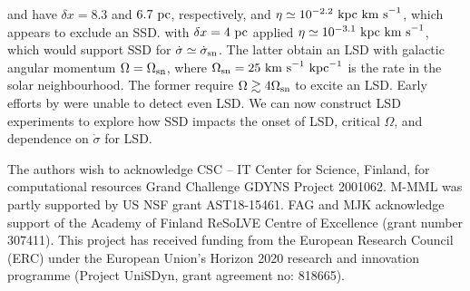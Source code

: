 \documentclass[preprint2]{aastex63}
\newcommand\SNr{\dot\sigma_{\rm sn}}
\newcommand\OSN{\Omega_{\rm sn}}
\newcommand\kpc{~ {\rm kpc}}
\newcommand\pc{~ {\rm pc}}
\newcommand\dx{ {\delta x}}
\newcommand\kms{~ {\rm km~ s}^{-1}}
\newcommand{\fg}[1]{\textcolor{midgreen}{#1}}
\begin{document}
 \citet{Gressel:2008} and \citet{GE20} have $\dx=8.3$ and $6.7\pc$,
 respectively, and $\eta\simeq10^{-2.2}\kpc\kms$, which appears to exclude
 an SSD.
 \citet{Gent:2013b} with $\dx=4\pc$ applied $\eta\simeq10^{-3.1}\kpc\kms$,
 which would support SSD for $\dot\sigma\simeq\SNr$.
 The latter obtain an LSD with galactic angular momentum $\Omega=\OSN$, where
 $\OSN=25\kms\kpc^{-1}$ is the rate in the solar neighbourhood.
 The former require $\Omega\gtrsim4\OSN$ to excite an LSD.
 Early efforts by \citet{Korpi:1999b} were unable to detect even LSD.
 \fg{We can now construct LSD experiments to explore how SSD impacts the 
 onset of LSD, critical $\Omega$, and dependence on $\dot\sigma$ for LSD.}   

\acknowledgments
The authors wish to acknowledge CSC – IT Center for Science, Finland, for
computational resources Grand Challenge GDYNS Project 2001062.
M-MML was partly supported by US NSF grant AST18-15461.
FAG and MJK acknowledge support of the Academy of Finland
ReSoLVE Centre of Excellence (grant number 307411).
This project has received funding from the European Research Council (ERC)
under the European Union's Horizon 2020 research and innovation
programme (Project UniSDyn, grant agreement no: 818665).
\end{document}
